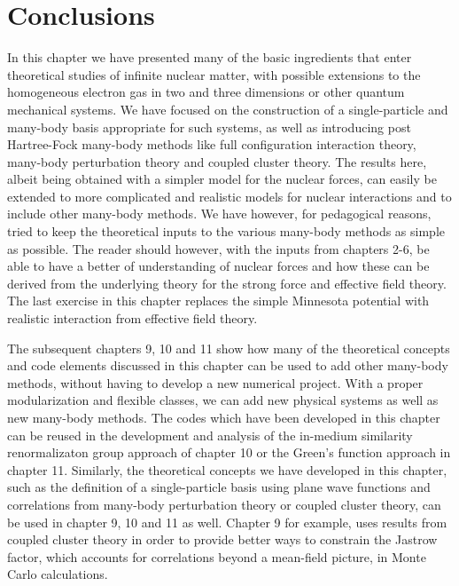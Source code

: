 \section{Conclusions}
In this chapter we have presented many of the basic ingredients that
enter theoretical studies of infinite nuclear matter, with possible
extensions to the homogeneous electron gas in two and three dimensions
or other quantum mechanical systems.  We have focused on the
construction of a single-particle and many-body basis appropriate for
such systems, as well as introducing post Hartree-Fock many-body
methods like full configuration interaction theory, many-body
perturbation theory and coupled cluster theory. The results here,
albeit being obtained with a simpler model for the nuclear forces, can
easily be extended to more complicated and realistic models for
nuclear interactions and to include other many-body methods. We have
however, for pedagogical reasons, tried to keep the theoretical inputs
to the various many-body methods as simple as possible. The reader
should however, with the inputs from chapters 2-6, be able to have a
better of understanding of nuclear forces and how these can be derived
from the underlying theory for the strong force and effective field
theory.  The last exercise in this chapter replaces the simple Minnesota potential with
realistic interaction from effective field theory. 



The subsequent chapters 9, 10 and 11 show how many of the theoretical
concepts and code elements discussed in this chapter can be used to
add other many-body methods, without having to develop a new numerical
project.  With a proper modularization and flexible classes, we can
add new physical systems as well as new many-body methods.  The codes
which have been developed in this chapter can be reused in the
development and analysis of the in-medium similarity renormalizaton
group approach of chapter 10 or the Green's function approach in chapter 11. Similarly, the theoretical concepts we
have developed in this chapter, such as the definition of a
single-particle basis using plane wave functions and correlations from
many-body perturbation theory or coupled cluster theory, can be used
in chapter 9, 10 and 11 as well. Chapter 9 for example, uses results
from coupled cluster theory in order to provide better ways to constrain
the Jastrow factor, which accounts for correlations beyond a mean-field picture, 
in Monte Carlo calculations.




